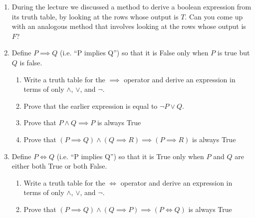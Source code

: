 \documentclass[a4paper]{article}
\begin{document}
\begin{enumerate}
\item During the lecture we discussed a method to derive a boolean expression from its truth table, by looking at the rows whose output is $T$.  Can you come up with an analogous method that involves looking at the rows whose output is $F$?

\item Define $P \implies Q$ (i.e. ``P implies Q'') so that it is False only when $P$ is true but $Q$ is false.
  \begin{enumerate}
  \item Write a truth table for the $\implies$ operator and derive an expression in terms of only $\land$, $\lor$, and $\neg$.
  \item Prove that the earlier expression is equal to $\neg P \lor Q$.
  \item Prove that $P \land Q \implies P$ is always True
  \item Prove that $(P \implies Q) \land (Q \implies R) \implies (P \implies R)$ is always True
  \end{enumerate}

\item Define $P \iff Q$ (i.e. ``P implies Q'') so that it is True only when $P$ and $Q$ are either both True or both False.
  \begin{enumerate}
  \item Write a truth table for the $\iff$ operator and derive an expression in terms of only $\land$, $\lor$, and $\neg$.
  \item Prove that $(P\implies Q) \land (Q \implies P) \implies (P \iff Q)$ is always True
  \end{enumerate}

\end{enumerate}
\end{document}
